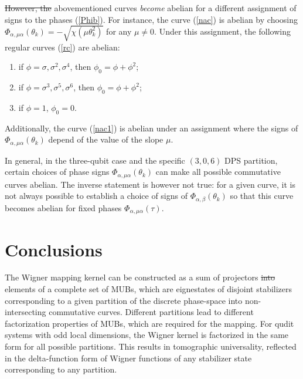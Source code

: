 \documentclass[quantumrep,article,submit,pdftex,moreauthors]{Definitions/mdpi}
\providecommand{\DIFadd}[1]{{\protect\color{blue}\uwave{#1}}} %
\providecommand{\DIFdel}[1]{{\protect\color{red}\sout{#1}}}                      %
\providecommand{\DIFaddbegin}{} %
\providecommand{\DIFaddend}{} %
\providecommand{\DIFdelbegin}{} %
\providecommand{\DIFdelend}{} %
\begin{document}
\DIFdelbegin \DIFdel{However, the }\DIFdelend \DIFaddbegin \DIFadd{The }\DIFaddend abovementioned curves \textit{become} abelian for a different assignment of
signs to the phases (\ref{Phib}). For instance, the curve (\ref{nac}) is abelian
by choosing
$\Phi_{\alpha,\mu\alpha}(\theta_{k})=-\sqrt{\chi\left(\mu\theta_{k}^{2}\right)}$
for any $\mu \neq 0$. Under this assignment, the following regular curves
(\ref{rc}) are abelian:

\begin{enumerate}
  \item if $\phi = \sigma, \sigma^{2}, \sigma^{4}$, then $\phi_{0} = \phi +
    \phi^{2}$;

\DIFaddbegin 

  \DIFaddend \item if $\phi = \sigma^{3}, \sigma^{5}, \sigma^{6}$, then $\phi_{0} = \phi +
    \phi^{2}$;

\DIFaddbegin 

  \DIFaddend \item if $\phi = 1$, $\phi_{0} = 0$.
\end{enumerate}

Additionally, the curve (\ref{nac1}) is abelian under an assignment where the
signs of $\Phi_{\alpha,\mu \alpha}(\theta_{k})$ depend of the value of the slope
$\mu$.

In general, in the three-qubit case and the specific $(3,0,6)$ DPS partition,
certain choices of phase signs $\Phi_{\alpha,\mu\alpha}(\theta_{k})$ can make
all possible commutative curves abelian. The inverse statement is however not
true: for a given curve, it is not always possible to establish a choice of
signs of $\Phi_{\alpha,\beta}(\theta_{k})$ so that this curve becomes abelian
for fixed phases $\Phi_{\alpha,\mu \alpha}(\tau)$.


\DIFaddbegin 

\DIFaddend \section{Conclusions}

The Wigner mapping kernel can be constructed as a sum of projectors \DIFdelbegin \DIFdel{into
}\DIFdelend \DIFaddbegin \DIFadd{onto
}\DIFaddend elements of a complete set of MUBs, which are eignestates of disjoint
stabilizers corresponding to a given partition of the discrete phase-space into
non-intersecting commutative curves. Different partitions lead to different
factorization properties of MUBs, which are required for the mapping. For qudit
systems with odd local dimensions, the Wigner kernel is factorized in the same
form for all possible partitions. This results in tomographic universality,
reflected in the delta-function form of Wigner functions of any stabilizer state
corresponding to any partition.
\end{document}
